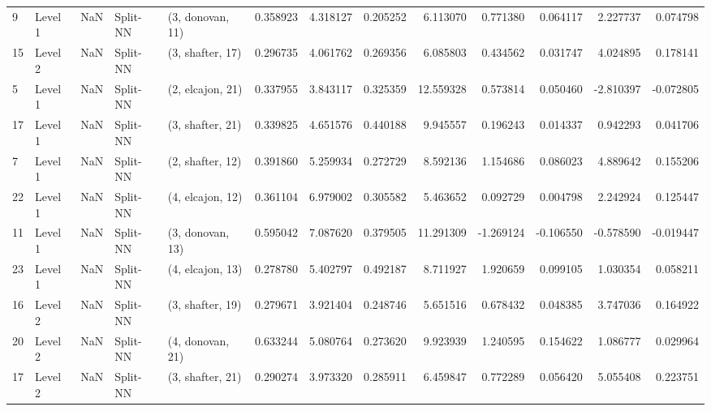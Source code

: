 \begin{tabular}{llrllrrrrrrrr}
9  &   Level 1 &    NaN &       Split-NN &  (3, donovan, 11) &   0.358923 &   4.318127 &  0.205252 &   6.113070 &             0.771380 &               0.064117 &            2.227737 &              0.074798 \\
15 &   Level 2 &    NaN &       Split-NN &  (3, shafter, 17) &   0.296735 &   4.061762 &  0.269356 &   6.085803 &             0.434562 &               0.031747 &            4.024895 &              0.178141 \\
5  &   Level 1 &    NaN &       Split-NN &  (2, elcajon, 21) &   0.337955 &   3.843117 &  0.325359 &  12.559328 &             0.573814 &               0.050460 &           -2.810397 &             -0.072805 \\
17 &   Level 1 &    NaN &       Split-NN &  (3, shafter, 21) &   0.339825 &   4.651576 &  0.440188 &   9.945557 &             0.196243 &               0.014337 &            0.942293 &              0.041706 \\
7  &   Level 1 &    NaN &       Split-NN &  (2, shafter, 12) &   0.391860 &   5.259934 &  0.272729 &   8.592136 &             1.154686 &               0.086023 &            4.889642 &              0.155206 \\
22 &   Level 1 &    NaN &       Split-NN &  (4, elcajon, 12) &   0.361104 &   6.979002 &  0.305582 &   5.463652 &             0.092729 &               0.004798 &            2.242924 &              0.125447 \\
11 &   Level 1 &    NaN &       Split-NN &  (3, donovan, 13) &   0.595042 &   7.087620 &  0.379505 &  11.291309 &            -1.269124 &              -0.106550 &           -0.578590 &             -0.019447 \\
23 &   Level 1 &    NaN &       Split-NN &  (4, elcajon, 13) &   0.278780 &   5.402797 &  0.492187 &   8.711927 &             1.920659 &               0.099105 &            1.030354 &              0.058211 \\
16 &   Level 2 &    NaN &       Split-NN &  (3, shafter, 19) &   0.279671 &   3.921404 &  0.248746 &   5.651516 &             0.678432 &               0.048385 &            3.747036 &              0.164922 \\
20 &   Level 2 &    NaN &       Split-NN &  (4, donovan, 21) &   0.633244 &   5.080764 &  0.273620 &   9.923939 &             1.240595 &               0.154622 &            1.086777 &              0.029964 \\
17 &   Level 2 &    NaN &       Split-NN &  (3, shafter, 21) &   0.290274 &   3.973320 &  0.285911 &   6.459847 &             0.772289 &               0.056420 &            5.055408 &              0.223751 \\

\end{tabular}
